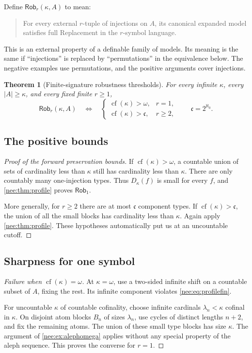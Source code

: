 \documentclass[11pt,letterpaper]{article}
\numberwithin{equation}{section}
\theoremstyle{plain}
\newtheorem{theorem}{Theorem}[section]
\theoremstyle{definition}
\theoremstyle{remark}
\newcommand{\cf}{\operatorname{cf}}
\newcommand{\cont}{\mathfrak c}
\begin{document}
Define $\mathsf{Rob}_r(\kappa,A)$ to mean:
\begin{quote}
For every external $r$-tuple of injections on $A$, its canonical expanded model satisfies full Replacement in the $r$-symbol language.
\end{quote}
This is an external property of a definable family of models. Its meaning is the same if ``injections'' is replaced by ``permutations'' in the equivalence below. The negative examples use permutations, and the positive arguments cover injections.

\begin{theorem}[Finite-signature robustness thresholds]\label{nee:thm:robust}
For every infinite $\kappa$, every $|A|\geq\kappa$, and every fixed finite $r\geq1$,
\begin{equation}\label{nee:eq:robust}
\mathsf{Rob}_r(\kappa,A)
\quad\Longleftrightarrow\quad
\begin{cases}
\cf(\kappa)>\omega,&r=1,\\
\cf(\kappa)>\cont,&r\geq2,
\end{cases}
\qquad \cont=2^{\aleph_0}.
\end{equation}
\end{theorem}

\subsection{The positive bounds}
\begin{proof}[Proof of the forward preservation bounds]
If $\cf(\kappa)>\omega$, a countable union of sets of cardinality less than $\kappa$ still has cardinality less than $\kappa$. There are only countably many one-injection types. Thus $D_\kappa(f)$ is small for every $f$, and \cref{nee:thm:profile} proves $\mathsf{Rob}_1$.

More generally, for $r\geq2$ there are at most $\cont$ component types. If $\cf(\kappa)>\cont$, the union of all the small blocks has cardinality less than $\kappa$. Again apply \cref{nee:thm:profile}. These hypotheses automatically put us at an uncountable cutoff.
\end{proof}

\subsection{Sharpness for one symbol}
\begin{proof}[Failure when $\cf(\kappa)=\omega$]
At $\kappa=\omega$, use a two-sided infinite shift on a countable subset of $A$, fixing the rest. Its infinite component violates \eqref{nee:eq:profilefin}.

For uncountable $\kappa$ of countable cofinality, choose infinite cardinals $\lambda_n<\kappa$ cofinal in $\kappa$. On disjoint atom blocks $B_n$ of sizes $\lambda_n$, use cycles of distinct lengths $n+2$, and fix the remaining atoms. The union of these small type blocks has size $\kappa$. The argument of \cref{nee:ex:alephomega} applies without any special property of the aleph sequence. This proves the converse for $r=1$.
\end{proof}
\end{document}
